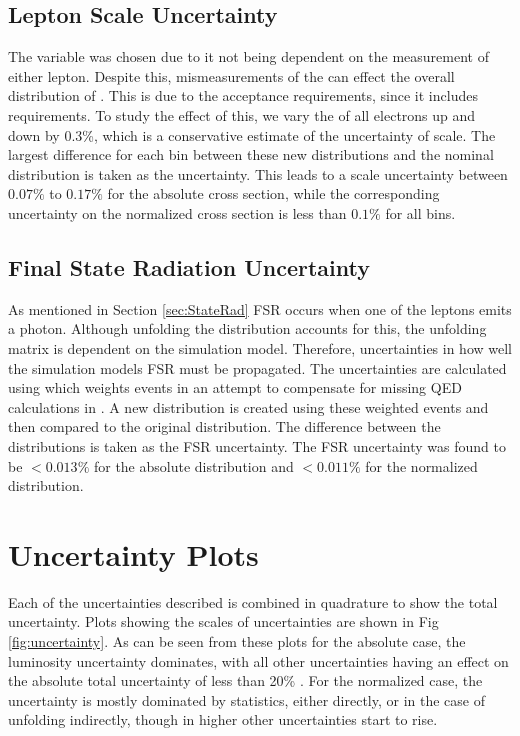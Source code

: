 \subsection{Lepton \texorpdfstring{\pt}{PT} Scale Uncertainty}
The variable \phistar was chosen due to it not being dependent on the \pt measurement of either lepton. Despite this, mismeasurements of the \pt can effect the overall distribution of \phistar. This is due to the acceptance requirements, since it includes \pt requirements. To study the effect of this, we vary the \pt of all electrons up and down by 0.3\%, which is a conservative estimate of the uncertainty of \pt scale. The largest difference for each bin between these new distributions and the nominal distribution is taken as the uncertainty. This leads to a \pt scale uncertainty between $0.07\%$ to $0.17\%$ for the absolute cross section, while the corresponding uncertainty on the normalized cross section is less than $0.1\%$ for all bins.
\subsection{Final State Radiation Uncertainty}
As mentioned in Section \ref{sec:StateRad} FSR occurs when one of the leptons emits a photon. Although unfolding the distribution accounts for this, the unfolding matrix is dependent on the simulation model. Therefore, uncertainties in how well the simulation  models FSR must be propagated. The uncertainties are calculated using \FSRWeightProducer which weights events in an attempt to compensate for missing QED calculations in \PYTHIA.  A new \phistar distribution is created using these weighted events and then compared to the original distribution. The difference between the distributions is taken as the FSR uncertainty. The FSR uncertainty was found to be $<0.013\%$ for the absolute distribution and $<0.011\%$ for the normalized distribution.


\section{Uncertainty Plots}
Each of the uncertainties described is combined in quadrature to show the total uncertainty. Plots showing the scales of uncertainties are shown in Fig \ref{fig:uncertainty}. As can be seen from these plots for the absolute case, the luminosity uncertainty dominates, with all other uncertainties having an effect on the absolute total uncertainty of less than 20\% . For the normalized case, the uncertainty is mostly dominated by statistics, either directly, or in the case of unfolding indirectly, though in higher \phistar other uncertainties start to rise. 

